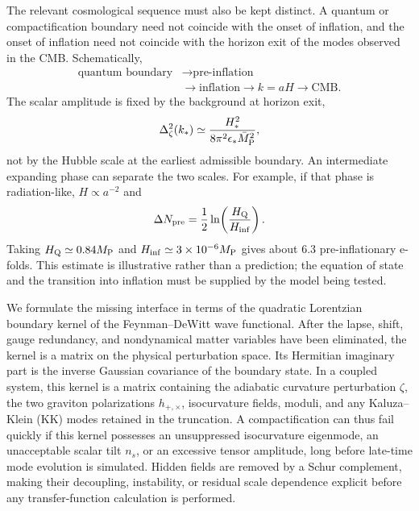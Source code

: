 \documentclass[11pt,a4paper]{article}
\newcommand{\Mpl}{\bar M_{\rm P}}
\begin{document}
The relevant cosmological sequence must also be kept distinct.  A quantum or compactification boundary need not coincide with the onset of inflation, and the onset of inflation need not coincide with the horizon exit of the modes observed in the CMB.  Schematically,
\begin{equation}
\begin{split}
\text{quantum boundary}&\longrightarrow\text{pre-inflation}\nonumber\\
&\longrightarrow\text{inflation}\longrightarrow k=aH\longrightarrow\text{CMB}.
\end{split}
\end{equation}
The scalar amplitude is fixed by the background at horizon exit,
\begin{equation}
\Delta_\zeta^2(k_*)\simeq
\frac{H_*^2}{8\pi^2\epsilon_*\Mpl^2},
\end{equation}
not by the Hubble scale at the earliest admissible boundary.  An intermediate expanding phase can separate the two scales.  For example, if that phase is radiation-like, $H\propto a^{-2}$ and
\begin{equation}
\Delta N_{\rm pre}=\frac12\ln\!\left(\frac{H_{\rm Q}}{H_{\rm inf}}\right).
\end{equation}
Taking $H_{\rm Q}\simeq0.84M_{\rm P}$ and $H_{\rm inf}\simeq3\times10^{-6}M_{\rm P}$ gives about $6.3$ pre-inflationary e-folds.  This estimate is illustrative rather than a prediction; the equation of state and the transition into inflation must be supplied by the model being tested.

We formulate the missing interface in terms of the quadratic Lorentzian boundary kernel of the Feynman--DeWitt wave functional. After the lapse, shift, gauge redundancy, and nondynamical matter variables have been eliminated, the kernel is a matrix on the physical perturbation space. Its Hermitian imaginary part is the inverse Gaussian covariance of the boundary state. In a coupled system, this kernel is a matrix containing the adiabatic curvature perturbation $\zeta$, the two graviton polarizations $h_{+,\times}$, isocurvature fields, moduli, and any Kaluza--Klein (KK) modes retained in the truncation. A compactification can thus fail quickly if this kernel possesses an unsuppressed isocurvature eigenmode, an unacceptable scalar tilt $n_s$, or an excessive tensor amplitude, long before late-time mode evolution is simulated. Hidden fields are removed by a Schur complement, making their decoupling, instability, or residual scale dependence explicit before any transfer-function calculation is performed.
\end{document}
